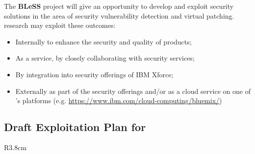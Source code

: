 \documentclass[a4paper,11pt]{article}
\newcommand{\project}[1]{\textbf{#1}\xspace}
\newcommand{\BLESS}{\project{BLeSS}}
\newcommand{\TheProject}{\BLESS}
\begin{document}
The \TheProject{} project will give \IBMshort{} an opportunity to develop and exploit security solutions in the area of security vulnerability detection and virtual patching. \IBMshort{} research may exploit these outcomes:
\begin{itemize}
\item
Internally to enhance the security and quality of \IBMshort{} products; 
\item
As a service, by closely collaborating with \IBMshort{} security services;
\item
By integration into \IBMshort{} security offerings of IBM Xforce;
\item
Externally as part of the \IBMshort{} security offerings and/or as a cloud service on one of \IBMshort{}'s platforms (e.g. \url{https://www.ibm.com/cloud-computing/bluemix/})
\end{itemize}
\vspace{-6pt}

\horizontalline

\subsection*{Draft Exploitation Plan for \PRshort{}}

\begin{wrapfigure}{R}{3.8cm}
\vspace{-1.5cm}
\hfill {}
\vspace{-1.5cm}
\end{wrapfigure}
\end{document}
